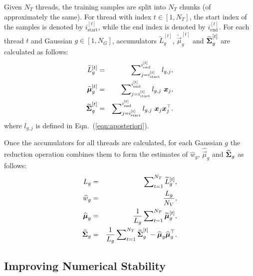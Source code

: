 Given $N_T$ threads, the training samples are split into $N_T$ chunks (of approximately the same).
For thread with index $t \in [1,N_T]$, the start index of the samples is denoted by $i^{[t]}_{\textrm{start}}$,
while the end index is denoted by $i^{[t]}_{\textrm{end}}$.
For each thread $t$ and Gaussian $g \in [1,N_G]$, accumulators $\widetilde{L}_g^{[t]}$, $\widetilde{\Vec{\mu}}_g^{[t]}$ and $\widetilde{{\boldsymbol{\Sigma}}}_g^{[t]}$
are calculated as follows:
%
\begin{eqnarray}
  \widetilde{L}_g^{[t]}            & = & \sum\nolimits_{j = i^{[t]}_{\textrm{start}}}^{i^{[t]}_{\textrm{end}}} l_{g,j},                             \\ %
  \widetilde{\Vec{\mu}}_g^{[t]}    & = & \sum\nolimits_{j = i^{[t]}_{\textrm{start}}}^{i^{[t]}_{\textrm{end}}} l_{g,j} ~ \Vec{x}_j,                 \\ %
  \widetilde{\Mat{\Sigma}}_g^{[t]} & = & \sum\nolimits_{j = i^{[t]}_{\textrm{start}}}^{i^{[t]}_{\textrm{end}}} l_{g,j} ~ \Vec{x}_j \Vec{x}_j^\top.    %
\end{eqnarray}%
%
where $l_{g,j}$ is defined in Eqn.~(\ref{eqn:aposteriori}).

Once the accumulators for all threads are calculated,
for each Gaussian $g$ the reduction operation combines them to form the estimates of $\widehat{w}_g$, $\widehat{\Vec{\mu}}_g$ and $\widehat{{\boldsymbol{\Sigma}}}_g$ as follows:
%
\begin{eqnarray}
  L_g                      & = & \sum\nolimits_{t=1}^{N_T} \widetilde{L}_g^{[t]},                           \\ %
  \widehat{w}_g            & = & \frac{L_g}{N_V},                                                           \\
  \widehat{\Vec{\mu}}_g    & = & \frac{1}{L_g} \sum\nolimits_{t=1}^{N_T} \widetilde{\Vec{\mu}}_g^{[t]},     \\
  \widehat{\Mat{\Sigma}}_g & = & \frac{1}{L_g} \sum\nolimits_{t=1}^{N_T} \widetilde{\Mat{\Sigma}}_g^{[t]} - \widehat{\Vec{\mu}}_g \widehat{\Vec{\mu}}_g^\top.
\end{eqnarray}

\subsection{Improving Numerical Stability}

